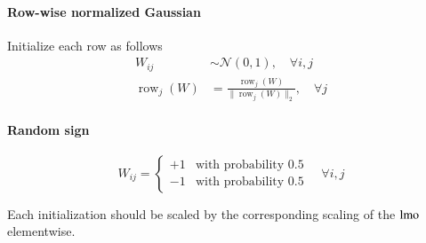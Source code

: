 \paragraph{Row-wise normalized Gaussian} Initialize each row as follows
\begin{equation*}
\begin{split}
W_{ij} &\sim \mathcal{N}(0, 1), \quad \forall i, j \\
\operatorname{row}_j(W) &= \frac{\operatorname{row}_j(W)}{\|\operatorname{row}_j(W)\|_2}, \quad \forall j
\end{split}
\end{equation*}

\paragraph{Random sign}
\[
W_{ij} = 
\begin{cases} 
+1 & \text{with probability } 0.5 \\
-1 & \text{with probability } 0.5
\end{cases} 
\quad \forall i, j
\]

Each initialization should be scaled by the corresponding scaling of the $\operatorname{lmo}$ elementwise.

